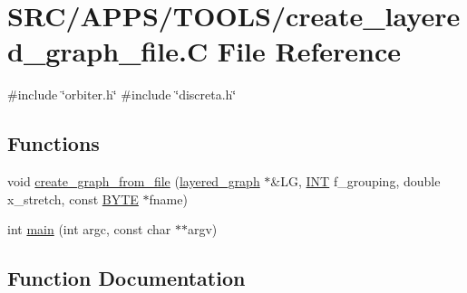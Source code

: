 \hypertarget{create__layered__graph__file_8_c}{}\section{S\+R\+C/\+A\+P\+P\+S/\+T\+O\+O\+L\+S/create\+\_\+layered\+\_\+graph\+\_\+file.C File Reference}
\label{create__layered__graph__file_8_c}
{\ttfamily \#include \char`\"{}orbiter.\+h\char`\"{}}\newline
{\ttfamily \#include \char`\"{}discreta.\+h\char`\"{}}\newline
\subsection*{Functions}
\begin{DoxyCompactItemize}
\item 
void \mbox{\hyperlink{create__layered__graph__file_8_c_a3861f0400d2bbd6a6228527acef31d77}{create\+\_\+graph\+\_\+from\+\_\+file}} (\mbox{\hyperlink{classlayered__graph}{layered\+\_\+graph}} $\ast$\&LG, \mbox{\hyperlink{galois_8h_a09fddde158a3a20bd2dcadb609de11dc}{I\+NT}} f\+\_\+grouping, double x\+\_\+stretch, const \mbox{\hyperlink{galois_8h_ab6cc7b4aeb6ea31aba2b3fbfc83ff5e6}{B\+Y\+TE}} $\ast$fname)
\item 
int \mbox{\hyperlink{create__layered__graph__file_8_c_a217dbf8b442f20279ea00b898af96f52}{main}} (int argc, const char $\ast$$\ast$argv)
\end{DoxyCompactItemize}


\subsection{Function Documentation}
\mbox{\label{create__layered__graph__file_8_c_a3861f0400d2bbd6a6228527acef31d77}} 
